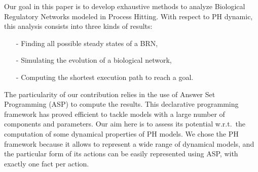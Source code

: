 Our goal in this paper is to develop exhaustive methods to analyze Biological Regulatory Networks modeled in Process Hitting. With respect to PH dynamic, this analysis consists into three kinds of results:
\begin{itemize}
\item[-] Finding all possible steady states of a BRN,
\item[-] Simulating the evolution of a biological network,
\item[-] Computing the shortest execution path to reach a goal.
\end{itemize}

 The particularity of our contribution relies in the use of Answer Set Programming
(ASP) \cite{baral2003knowledge}
to compute the results.
This declarative programming framework has proved efficient
to tackle models with a large number of components and parameters.
Our aim here is to assess its potential w.r.t.\ the computation
of some dynamical properties of PH models.
We chose the PH framework because it allows to represent a wide range of dynamical models,
and the particular form of its actions
can be easily represented using ASP,
with exactly one fact per action.
